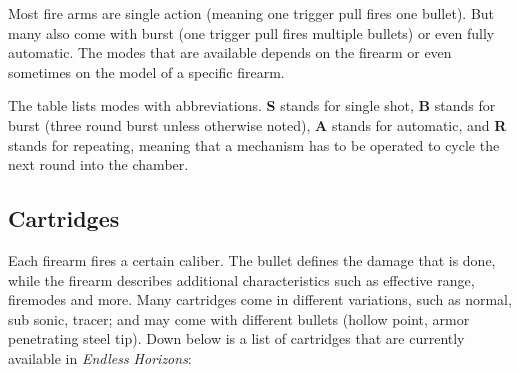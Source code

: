 Most fire arms are single action (meaning one trigger pull fires one bullet).
But many also come with burst (one trigger pull fires multiple bullets) or
even fully automatic. The modes that are available depends on the firearm or
even sometimes on the model of a specific firearm.

The table lists modes with abbreviations. \textbf{S} stands for single shot,
\textbf{B} stands for burst (three round burst unless otherwise noted),
\textbf{A} stands for automatic, and \textbf{R} stands for repeating, meaning
that a mechanism has to be operated to cycle the next round into the chamber.

\subsection{Cartridges}

Each firearm fires a certain caliber. The bullet defines the damage that is
done, while the firearm describes additional characteristics such as effective
range, firemodes and more. Many cartridges come in different variations, such as
normal, sub sonic, tracer; and may come with different bullets (hollow point,
armor penetrating steel tip). Down below is a list of cartridges that are
currently available in \emph{Endless Horizons}:

